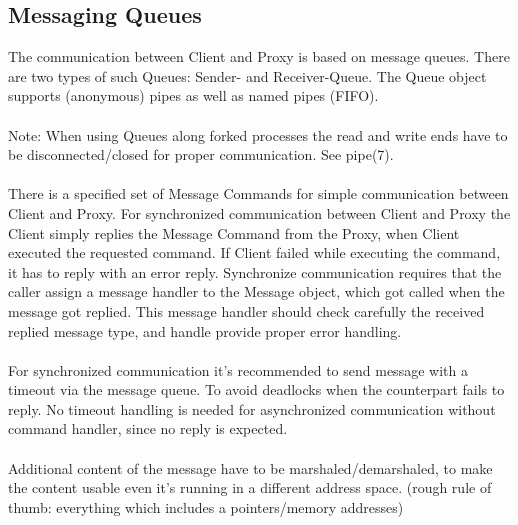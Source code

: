 \subsection{Messaging Queues}
The communication between Client and Proxy is based on message queues. There are
two types of such Queues: Sender- and Receiver-Queue. The Queue object supports
(anonymous) pipes as well as named pipes (FIFO).\\
\\
Note: When using Queues along forked processes the read and write ends have to
be disconnected/closed for proper communication. See pipe(7).\\
\\
There is a specified set of Message Commands for simple communication between
Client and Proxy. For synchronized communication between Client and Proxy the
Client simply replies the Message Command from the Proxy, when Client executed
the requested command. If Client failed while executing the command, it has to
reply with an error reply. Synchronize communication requires that the caller
assign a message handler to the Message object, which got called when the
message got replied. This message handler should check carefully the received
replied message type, and handle provide proper error handling.\\
\\
For synchronized communication it's recommended to send message with a timeout
via the message queue. To avoid deadlocks when the counterpart fails to reply.
No timeout handling is needed for asynchronized communication without command
handler, since no reply is expected.\\
\\
Additional content of the message have to be marshaled/demarshaled, to make the
content usable even it's running in a different address space. (rough rule of 
thumb: everything which includes a pointers/memory addresses)

